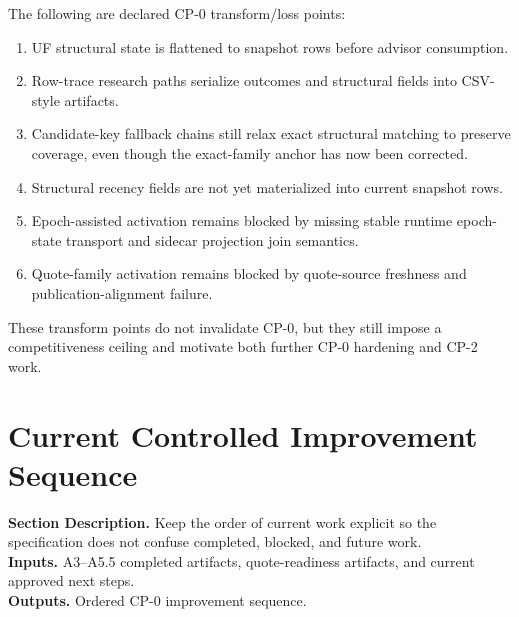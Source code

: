 \documentclass[11pt]{report}
\newcommand{\meta}[3]{\textbf{Section Description.} #1\\
\textbf{Inputs.} #2\\
\textbf{Outputs.} #3\par}
\begin{document}
The following are declared CP-0 transform/loss points:
\begin{enumerate}[leftmargin=1.2cm]
    \item UF structural state is flattened to snapshot rows before advisor consumption.
    \item Row-trace research paths serialize outcomes and structural fields into CSV-style artifacts.
    \item Candidate-key fallback chains still relax exact structural matching to preserve coverage, even though the exact-family anchor has now been corrected.
    \item Structural recency fields are not yet materialized into current snapshot rows.
    \item Epoch-assisted activation remains blocked by missing stable runtime epoch-state transport and sidecar projection join semantics.
    \item Quote-family activation remains blocked by quote-source freshness and publication-alignment failure.
\end{enumerate}
These transform points do not invalidate CP-0, but they still impose a competitiveness ceiling and motivate both further CP-0 hardening and CP-2 work.

\section{Current Controlled Improvement Sequence}
\meta{Keep the order of current work explicit so the specification does not confuse completed, blocked, and future work.}{A3--A5.5 completed artifacts, quote-readiness artifacts, and current approved next steps.}{Ordered CP-0 improvement sequence.}
\end{document}
